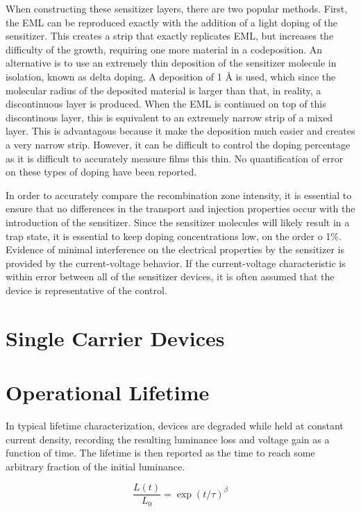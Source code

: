 \documentclass[../thesis.tex]{subfiles}
\begin{document}
When constructing these sensitizer layers, there are two popular methods.  
First, the EML can be reproduced exactly with the addition of a light doping of the sensitizer.  
This creates a strip that exactly replicates EML, but increases the difficulty of the growth, requiring one more material in a codeposition.
An alternative is to use an extremely thin deposition of the sensitizer molecule in isolation, known as delta doping.
A deposition of 1 \r{A} is used, which since the molecular radius of the deposited material is larger than that, in reality, a discontinuous layer is produced.
When the EML is continued on top of this discontinous layer, this is equivalent to an extremely narrow strip of a mixed layer.
This is advantagous because it make the deposition much easier and creates a very narrow strip.
However, it can be difficult to control the doping percentage as it is difficult to accurately measure films this thin.
No quantification of error on these types of doping have been reported.

In order to accurately compare the recombination zone intensity, it is essential to ensure that no differences in the transport and injection properties occur with the introduction of the sensitizer.
Since the sensitizer molecules will likely result in a trap state, it is essential to keep doping concentrations low, on the order o 1\%.
Evidence of minimal interference on the electrical properties by the sensitizer is provided by the current-voltage behavior.
If the current-voltage characteristic is within error between all of the sensitizer devices, it is often assumed that the device is representative of the control.\supercite{Erickson2013a}

\section{Single Carrier Devices}

\section{Operational Lifetime}
In typical lifetime characterization, devices are degraded while held at constant current density, recording the resulting luminance loss and voltage gain as a function of time.  
The lifetime is then reported as the time to reach some arbitrary fraction of the initial luminance.

\begin{equation}
\frac{L(t)}{L_0}=\exp (t/\tau)^\beta
\label{eqn:stretched_exponential}
\end{equation}
\end{document}
